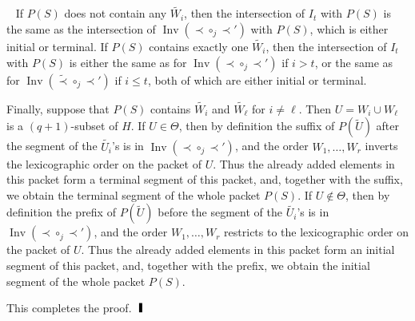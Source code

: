 \documentclass[12pt,a4paper]{article}
\newenvironment{proof}{\noindent{\bf Proof}~}%
{\hfill$\qed$\medskip}
\def\qed{ \ \vrule width.1cm height.3cm depth0cm}
\begin{document}
\begin{proof}
If \(P(S)\) does not contain any \(\widetilde{W_i}\), then the intersection of \(I_t\)
with \(P(S)\) is the same as the intersection of
\(\operatorname{Inv}(\prec\circ_j\prec')\) with \(P(S)\), which is either initial or
terminal. If \(P(S)\) contains exactly one \(\widetilde{W_i}\), then the intersection of
\(I_t\) with \(P(S)\) is either the same as for
\(\operatorname{Inv}(\prec\circ_j\prec')\) if \(i > t\), or the same as for
\(\operatorname{Inv}(\widetilde{\prec}\circ_j\prec')\) if \(i \leq t\), both of which are
either initial or terminal.

Finally, suppose that \(P(S)\) contains \(\widetilde{W_i}\) and \(\widetilde{W_\ell}\)
for \(i \neq \ell\). Then \(U = W_i \cup W_\ell\) is a \((q+1)\)-subset of \(H\). If
\(U \in \Theta\), then by definition the suffix of \(P(\widetilde U)\) after the
segment of the \(\widetilde{U_i}\)'s is in
\(\operatorname{Inv}(\prec\circ_j\prec')\), and the order
\(W_1,\ldots,W_r\) inverts the lexicographic order on the packet of \(U\). Thus the
already added elements in this packet form a terminal segment of this packet, and,
together with the suffix, we obtain the terminal segment of the whole packet \(P(S)\).
If \(U \notin \Theta\), then by definition the prefix of \(P(\widetilde U)\) before the
segment of the \(\widetilde{U_i}\)'s is in \(\operatorname{Inv}(\prec\circ_j\prec')\),
and the order \(W_1,\ldots,W_r\) restricts to the lexicographic order on the packet of
\(U\). Thus the already added elements in this packet form an initial segment of this
packet, and, together with the prefix, we obtain the initial segment of the whole packet
\(P(S)\).

This completes the proof.
\end{proof}



\end{document}
